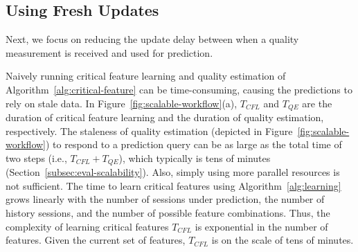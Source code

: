 \subsection{Using Fresh Updates}
\label{subsec:scalability}

Next, we focus on reducing the update delay
between when a quality measurement is received and 
used for prediction. 



Naively running critical feature learning and quality 
estimation of Algorithm~\ref{alg:critical-feature}
can be time-consuming, causing the predictions to 
rely on stale data.
In Figure~\ref{fig:scalable-workflow}(a), $T_{CFL}$ and 
$T_{QE}$ are the duration of critical feature learning and 
the duration of quality estimation, respectively. 
The staleness of quality estimation (depicted in 
Figure~\ref{fig:scalable-workflow}) 
to respond to a prediction query can be as large as the 
total time of two steps (i.e., $T_{CFL}+T_{QE}$), which 
typically is tens of minutes 
(Section~\ref{subsec:eval-scalability}).
Also, simply using more parallel resources is not sufficient. 
The time to learn critical features using
Algorithm~\ref{alg:learning} grows linearly with the number of 
sessions under prediction, the number of history sessions,
and the number of possible feature combinations.
Thus, the complexity of learning critical features $T_{CFL}$ is 
exponential in the number of features. Given the current 
set of features, $T_{CFL}$ is on the scale of tens of minutes.


